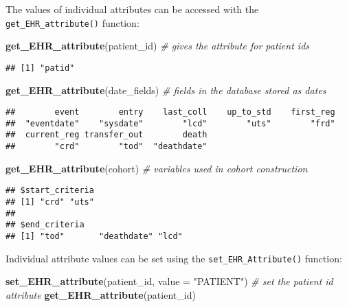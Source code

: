 \documentclass[]{article}
\newenvironment{Shaded}{\begin{snugshade}}{\end{snugshade}}
\newcommand{\KeywordTok}[1]{\textcolor[rgb]{0.13,0.29,0.53}{\textbf{{#1}}}}
\newcommand{\DataTypeTok}[1]{\textcolor[rgb]{0.13,0.29,0.53}{{#1}}}
\newcommand{\StringTok}[1]{\textcolor[rgb]{0.31,0.60,0.02}{{#1}}}
\newcommand{\CommentTok}[1]{\textcolor[rgb]{0.56,0.35,0.01}{\textit{{#1}}}}
\newcommand{\NormalTok}[1]{{#1}}
\begin{document}
The values of individual attributes can be accessed with the
\texttt{get\_EHR\_attribute()} function:

\begin{Shaded}
\begin{Highlighting}[]
\KeywordTok{get_EHR_attribute}\NormalTok{(patient_id) }\CommentTok{# gives the attribute for patient ids}
\end{Highlighting}
\end{Shaded}

\begin{verbatim}
## [1] "patid"
\end{verbatim}

\begin{Shaded}
\begin{Highlighting}[]
\KeywordTok{get_EHR_attribute}\NormalTok{(date_fields) }\CommentTok{# fields in the database stored as dates}
\end{Highlighting}
\end{Shaded}

\begin{verbatim}
##        event        entry    last_coll    up_to_std    first_reg 
##  "eventdate"    "sysdate"        "lcd"        "uts"        "frd" 
##  current_reg transfer_out        death 
##        "crd"        "tod"  "deathdate"
\end{verbatim}

\begin{Shaded}
\begin{Highlighting}[]
\KeywordTok{get_EHR_attribute}\NormalTok{(cohort) }\CommentTok{# variables used in cohort construction}
\end{Highlighting}
\end{Shaded}

\begin{verbatim}
## $start_criteria
## [1] "crd" "uts"
## 
## $end_criteria
## [1] "tod"       "deathdate" "lcd"
\end{verbatim}

Individual attribute values can be set using the
\texttt{set\_EHR\_Attribute()} function:

\begin{Shaded}
\begin{Highlighting}[]
\KeywordTok{set_EHR_attribute}\NormalTok{(patient_id, }\DataTypeTok{value =} \StringTok{"PATIENT"}\NormalTok{) }\CommentTok{# set the patient id attribute}
\KeywordTok{get_EHR_attribute}\NormalTok{(patient_id)}
\end{Highlighting}
\end{Shaded}
\end{document}
